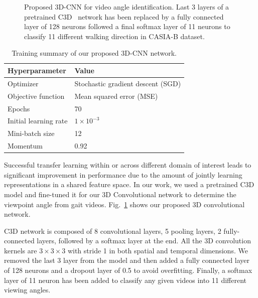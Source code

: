 \begin{figure}
	\caption{
		Proposed 3D-CNN for video angle identification. Last 3 layers of a pretrained C3D~\cite{Tran_15} network has been replaced by a fully connected layer of 128 neurons followed a final softmax layer of 11 neurons to classify 11 different walking direction in CASIA-B dataset.
	}
	\label{fig:3D_CNN}
\end{figure}

\begin{table}
	\centering
	\caption{Training summary of our proposed 3D-CNN network.  \label{table:summary_3dcnn}}
	\begin{tabular*}{30pc}{@{\extracolsep{\fill}}ll@{}}
			\hline \noalign{\vspace{3pt}}
			\textbf{Hyperparameter} & \textbf{Value} \\ \hline\noalign{\vspace{3pt}}
			Optimizer  &Stochastic gradient descent (SGD)  \\ [3pt]
			Objective function  &Mean squared error (MSE) \\ [3pt]
			Epochs  &70  \\ [3pt]
			Initial learning rate & $1 \times 10^{-3}$ \\ [3pt]
			Mini-batch size	  &12  \\ [3pt]
			Momentum  &0.92 \\ [3pt]
			\hline
	\end{tabular*}
\end{table}

Successful transfer learning within or across different domain of interest leads to significant improvement in performance due to the amount of jointly learning representations in a shared feature space. In our work, we used a pretrained C3D model and fine-tuned it for our 3D Convolutional network to determine the viewpoint angle from gait videos. Fig.~\ref{fig:3D_CNN} shows our proposed 3D convolutional network. 

C3D network is composed of 8 convolutional layers, 5 pooling layers, 2 fully-connected layers, followed by a softmax layer at the end. All the 3D convolution kernels are $3\times3\times3$ with stride 1 in both spatial and temporal dimensions. We removed the last 3 layer from the model and then added a fully connected layer of 128 neurons and a dropout layer of 0.5 to avoid overfitting. Finally, a softmax layer of 11 neuron has been added to classify any given videos into 11 different viewing angles. 


